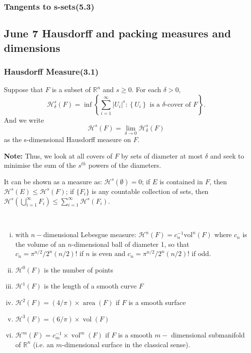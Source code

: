 \subsubsection{Tangents to s-sets(5.3)}

\newpage

\subsection{June 7 Hausdorff and packing measures and dimensions}
\subsubsection{Hausdorff Measure(3.1)}
\begin{definition}
    Suppose that $F$ is a subset of $\mathbb{R}^n$ and $s\geq 0$. For each $\delta >0$,
    $$
    \mathcal{H}_{\delta}^{s}(F)=\inf \left\{\sum_{i=1}^{\infty}\left|U_{i}\right|^{s}:\left\{U_{i}\right\} \text { is a } \delta \text {-cover of } F\right\} .
    $$
    And we write
    $$
    \mathcal{H}^s (F) = \lim_{\delta\rightarrow 0} \mathcal{H}^s_\delta(F)
    $$
    as the s-dimensional Hausdorff measure on $F$.
\end{definition}

\textbf{Note:}
Thus, we look at all covers of $F$ by sets of diameter at most $\delta$ and seek to minimise the sum of the  $s^{th}$ powers of the diameters.

It can be shown as a measure as: $\mathcal{H}^s(\emptyset) = 0$; if $E$ is contained in $F$, then $\mathcal{H}^s(E)\leq \mathcal{H}^s(F)$; if $\{F_i\}$ is any countable collection of sets, then $\displaystyle \mathcal{H}^{s}\left(\bigcup_{i=1}^{\infty} F_{i}\right) \leq \sum_{i=1}^{\infty} \mathcal{H}^{s}\left(F_{i}\right)$.

\begin{property} $ $
    \begin{enumerate}[(i)]
        \item with $n-$dimensional Lebesgue measure: $\mathcal{H}^n(F) = c_n^{-1} \text{vol}^n(F)$ where $c_n$ is the volume of an $n$-dimensional ball of diameter 1, so that $c_{n}=\pi^{n / 2} / 2^{n}(n / 2) !$ if $n$ is even and $c_{n}=\pi^{n / 2} / 2^{n}(n / 2) !$ if odd.
        \item $\mathcal{H}^0(F)$ is the number of points
        \item $\mathcal{H}^1(F)$ is the length of a smooth curve $F$
        \item $\mathcal{H}^2(F) = (4/\pi) \times \operatorname{area}(F)$ if $F$ is a smooth surface
        \item $\mathcal{H}^{3}(F)=(6 / \pi) \times \operatorname{vol}(F)$
        \item $\mathcal{H}^{m}(F)=c_{m}^{-1} \times \operatorname{vol}^{m}(F)$ if $F$ is a smooth $m-$
        dimensional submanifold of $\mathbb{R}^{n}$ (i.e. an $m$-dimensional surface in the classical sense).
    \end{enumerate}
\end{property}

